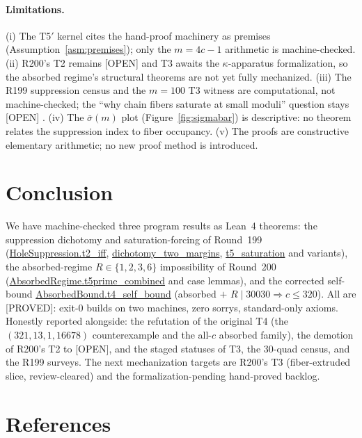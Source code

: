 \documentclass[11pt,a4paper]{article}
\theoremstyle{definition}
\begin{document}
\paragraph{Limitations.} (i) The T5$'$ kernel cites the hand-proof
machinery as premises (Assumption~\ref{asm:premises}); only the
$m=4c-1$ arithmetic is machine-checked. (ii) R200's T2 remains [OPEN]
and T3 awaits the $\kappa$-apparatus formalization, so the absorbed
regime's structural theorems are not yet fully mechanized. (iii) The
R199 suppression census and the $m=100$ T3 witness are computational,
not machine-checked; the ``why chain fibers saturate at small
moduli'' question stays [OPEN] \cite{D199}. (iv) The
$\bar\sigma(m)$ plot (Figure~\ref{fig:sigmabar}) is descriptive: no
theorem relates the suppression index to fiber occupancy. (v) The
proofs are constructive elementary arithmetic; no new proof method is
introduced.

\section{Conclusion}

We have machine-checked three program results as Lean~4 theorems:
the suppression dichotomy and saturation-forcing of Round~199
(\url{HoleSuppression.t2_iff}, \url{dichotomy_two_margins},
\url{t5_saturation} and variants), the absorbed-regime
$R\in\{1,2,3,6\}$ impossibility of Round~200
(\url{AbsorbedRegime.t5prime_combined} and case lemmas), and the
corrected self-bound \url{AbsorbedBound.t4_self_bound}
(absorbed $+$ $R\mid30030\Rightarrow c\le320$). All are [PROVED]:
exit-0 builds on two machines, zero sorrys, standard-only axioms.
Honestly reported alongside: the refutation of the original T4 (the
$(321,13,1,16678)$ counterexample and the all-$c$ absorbed family),
the demotion of R200's T2 to [OPEN], and the staged statuses of T3,
the 30-quad census, and the R199 surveys. The next mechanization
targets are R200's T3 (fiber-extruded slice, review-cleared) and the
formalization-pending hand-proved backlog.

\section{References}
\end{document}
